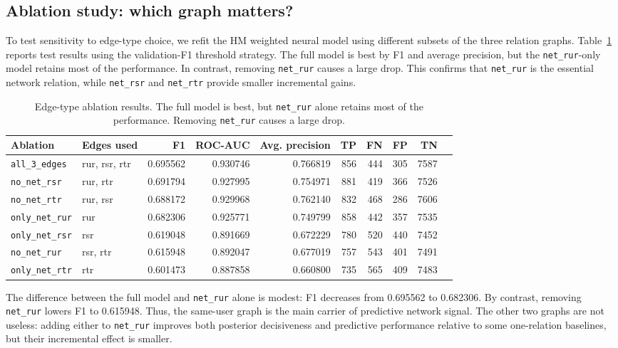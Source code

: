 \documentclass[twoside]{article}
\newcommand{\netrur}{\texttt{net\_rur}}
\newcommand{\netrsr}{\texttt{net\_rsr}}
\newcommand{\netrtr}{\texttt{net\_rtr}}
\begin{document}
\subsection{Ablation study: which graph matters?}

To test sensitivity to edge-type choice, we refit the HM weighted neural model using different subsets of the three relation graphs. Table~\ref{tab:ablation} reports test results using the validation-F1 threshold strategy. The full model is best by F1 and average precision, but the \netrur-only model retains most of the performance. In contrast, removing \netrur{} causes a large drop. This confirms that \netrur{} is the essential network relation, while \netrsr{} and \netrtr{} provide smaller incremental gains.

\begin{table}[t]
\centering
\caption{Edge-type ablation results. The full model is best, but \netrur{} alone retains most of the performance. Removing \netrur{} causes a large drop.}
\label{tab:ablation}
\begin{tabular}{llrrrrrrrr}
\toprule
Ablation & Edges used & F1 & ROC-AUC & Avg. precision & TP & FN & FP & TN \\
\midrule
\texttt{all\_3\_edges} & rur, rsr, rtr & 0.695562 & 0.930746 & 0.766819 & 856 & 444 & 305 & 7587 \\
\texttt{no\_net\_rsr} & rur, rtr & 0.691794 & 0.927995 & 0.754971 & 881 & 419 & 366 & 7526 \\
\texttt{no\_net\_rtr} & rur, rsr & 0.688172 & 0.929968 & 0.762140 & 832 & 468 & 286 & 7606 \\
\texttt{only\_net\_rur} & rur & 0.682306 & 0.925771 & 0.749799 & 858 & 442 & 357 & 7535 \\
\texttt{only\_net\_rsr} & rsr & 0.619048 & 0.891669 & 0.672229 & 780 & 520 & 440 & 7452 \\
\texttt{no\_net\_rur} & rsr, rtr & 0.615948 & 0.892047 & 0.677019 & 757 & 543 & 401 & 7491 \\
\texttt{only\_net\_rtr} & rtr & 0.601473 & 0.887858 & 0.660800 & 735 & 565 & 409 & 7483 \\
\bottomrule
\end{tabular}
\end{table}

The difference between the full model and \netrur{} alone is modest: F1 decreases from 0.695562 to 0.682306. By contrast, removing \netrur{} lowers F1 to 0.615948. Thus, the same-user graph is the main carrier of predictive network signal. The other two graphs are not useless: adding either to \netrur{} improves both posterior decisiveness and predictive performance relative to some one-relation baselines, but their incremental effect is smaller.
\end{document}
